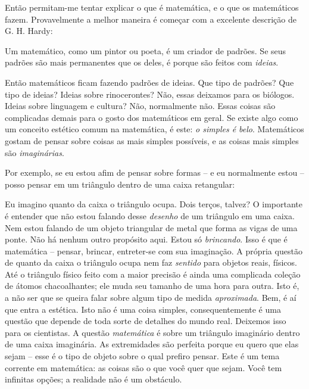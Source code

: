 \documentclass[a4paper,oneside,12pt,notitlepage]{article}
\begin{document}
Então permitam-me tentar explicar o que é matemática, e o que os matemáticos fazem.
Provavelmente a melhor maneira é começar com a excelente descrição de G. H. Hardy:

\begin{center}
 Um matemático, como um pintor ou poeta, é um criador de padrões.
Se seus padrões são mais permanentes que os deles, é porque são feitos com \textsl{ideias}.
\end{center}

Então matemáticos ficam fazendo padrões de ideias.
Que tipo de padrões? Que tipo de ideias?
Ideias sobre rinocerontes? Não, essas deixamos para os biólogos.
Ideias sobre linguagem e cultura? Não, normalmente não.
Essas coisas são complicadas demais para o gosto dos matemáticos em geral.
Se existe algo como um conceito estético comum na matemática, é este: \textsl{o simples é belo}.
Matemáticos gostam de pensar sobre coisas as mais simples possíveis, e as coisas mais simples são \textsl{imaginárias}.

Por exemplo, se eu estou afim de pensar sobre formas -- e eu normalmente estou -- posso pensar em um triângulo dentro de uma caixa retangular:


Eu imagino quanto da caixa o triângulo ocupa.
Dois terços, talvez?
O importante é entender que não estou falando desse \textsl{desenho} de um triângulo em uma caixa.
Nem estou falando de um objeto triangular de metal que forma as vigas de uma ponte. %
Não há nenhum outro propósito aqui.
Estou só \textsl{brincando}.
Isso é que é matemática -- pensar, brincar, entreter-se com sua imaginação.
A própria questão de quanto da caixa o triângulo ocupa nem faz \textsl{sentido} para objetos reais, físicos.
Até o triângulo físico feito com a maior precisão é ainda uma complicada coleção de átomos chacoalhantes; ele muda seu tamanho de uma hora para outra.
Isto é, a não ser que se queira falar sobre algum tipo de medida \textsl{aproximada}.
Bem, é aí que entra a estética.
Isto não é uma coisa simples, consequentemente é uma questão que depende de toda sorte de detalhes do mundo real.
Deixemos isso para os cientistas.
A questão \textsl{matemática} é sobre um triângulo imaginário dentro de uma caixa imaginária.
As extremidades são perfeita porque eu quero que elas sejam -- esse é o tipo de objeto sobre o qual prefiro pensar.
Este é um tema corrente em matemática: as coisas são o que você quer que sejam.
Você tem infinitas opções; a realidade não é um obstáculo.
\end{document}
